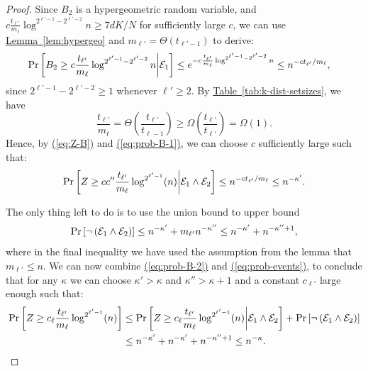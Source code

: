 \documentclass{theoretics}
\newcommand{\eq}[1]{\hyperref[eq:#1]{(\ref*{eq:#1})}}
\newcommand{\lem}[1]{\hyperref[lem:#1]{Lemma~\ref*{lem:#1}}}
\newcommand{\tabl}[1]{\hyperref[tab:#1]{Table~\ref*{tab:#1}}}
\renewcommand{\>}{\rangle}
\newcommand{\<}{\langle}
\renewcommand{\(}{\left(}
\renewcommand{\)}{\right)}
\begin{document}
\begin{proof}
Since $B_2$ is a hypergeometric random variable, and $c\frac{t_{\ell'}}{m_{\ell}}\log^{2^{\ell'-1}-2^{\ell'-2}} n \geq 7dK/N$ for sufficiently large $c$,
we can use \lem{hypergeo} and $m_{\ell'} = \Theta\left(t_{\ell'-1}\right)$ to derive:
\begin{equation}\label{eq:prob-B-1}
\begin{aligned}
	\Pr\left[B_2 \geq c\frac{t_{\ell'}}{m_{\ell}}\log^{2^{\ell'-1}-2^{\ell'-2}} n\middle| {\cal E}_1\right] &\leq 
 e^{-c\frac{t_{\ell'}}{m_{\ell}}\log^{2^{\ell'-1}-2^{\ell'-2}} n} 
\leq n^{-c t_{\ell'}/m_{\ell}},
\end{aligned}
\end{equation}
since $2^{\ell'-1}-2^{\ell'-2}\geq 1$ whenever $\ell'\geq 2$. By \tabl{k-dist-setsizes}, we have
$$\frac{t_{\ell'}}{m_{\ell}} = \Theta\left(\frac{t_{\ell'}}{t_{\ell-1}}\right) \geq \Omega \left(\frac{t_{\ell'}}{t_{\ell'}}\right)= \Omega(1).$$
Hence, by \eq{Z-B} and \eq{prob-B-1}, we can choose $c$ sufficiently large such that:
\begin{equation}\label{eq:prob-B-2}
	\Pr\left[Z \geq cc''\frac{t_{\ell'}}{m_{\ell}}\log^{2^{\ell'-1}} (n)\middle| {\cal E}_1 \wedge {\cal E}_2\right] \leq n^{-ct_{\ell'}/m_{\ell}} \leq n^{-\kappa'}.
\end{equation}

\noindent The only thing left to do is to use the union bound to upper bound
\begin{equation}\label{eq:prob-events}
	\Pr\left[\neg \left({\cal E}_1 \wedge {\cal E}_2\right) \right] \leq  n^{-\kappa'} +  m_{\ell'}n^{-\kappa''} \leq n^{-\kappa'} + n^{-\kappa''+1}, 
\end{equation}
where in the final inequality we have used the assumption from the lemma that $m_{\ell'}\leq n$.
We can now combine \eq{prob-B-2} and \eq{prob-events}, to conclude that for any $\kappa$ we can choose $\kappa'>\kappa$ and $\kappa'' > \kappa+1$ and a constant $c_{\ell'}$ large enough such that:
\begin{align*}
	\Pr\left[Z \geq c_{\ell}\frac{t_{\ell'}}{m_{\ell}}\log^{2^{\ell'-1}} (n)\right] &\leq \Pr\left[Z \geq c_{\ell}\frac{t_{\ell'}}{m_{\ell}}\log^{2^{\ell'-1}} (n)\middle| {\cal E}_1 \wedge {\cal E}_2 \right] + \Pr\left[\neg \left({\cal E}_1 \wedge {\cal E}_2\right) \right] \\
	&\leq n^{-\kappa'} +  n^{-\kappa'} + n^{-\kappa''+1} \leq n^{-\kappa}.\qedhere
\end{align*}
\end{proof}
\end{document}
